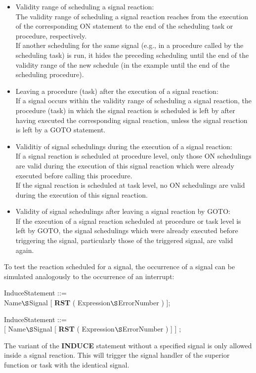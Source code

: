 \begin{itemize}
\item Validity range of scheduling a signal reaction:\\
The validity range of scheduling a signal reaction reaches from the
execution of the corresponding ON statement to the end of the
scheduling task or procedure, respectively.\\
If another scheduling for the same signal (e.g., in a procedure called
by the scheduling task) is run, it hides the preceding scheduling until
the end of the validity range of the new schedule (in the example until
the end of the scheduling procedure).
\item Leaving a procedure (task) after the execution of a signal
reaction:\\
If a signal occurs within the validity range of scheduling a signal
reaction, the procedure (task) in which the signal reaction is scheduled
is left by   after having executed the 
corresponding signal reaction, unless the signal reaction is left by a 
GOTO statement.
\item Validitiy of signal schedulings during the execution of a signal
reaction:\\
If a signal reaction is scheduled at procedure level, only those ON
schedulings are valid during the execution of this signal reaction which
were already executed before calling this procedure.\\
If the signal reaction is scheduled at task level, no ON schedulings are
valid during the execution of this signal reaction.
\item Validity of signal schedulings after leaving a signal reaction by
GOTO:\\
If the execution of a signal reaction scheduled at procedure or task
level is left by GOTO, the signal schedulings which were already
executed before triggering the signal, particularly those of the
triggered signal, are valid again.
\end{itemize}

To test the reaction scheduled for a signal, the occurrence of a signal
can be simulated analogously to the occurrence of an interrupt:

\begin{removed}
InduceStatement ::=\\
 Name$\S $Signal [ {\bf RST} ( Expression$\S $ErrorNumber ) ];
\end{removed}
\begin{added}
InduceStatement ::=\\
 [ Name$\S $Signal [ {\bf RST} ( Expression$\S $ErrorNumber ) ] ] ;

The variant of the {\bf INDUCE} statement without a specified signal is 
only allowed inside a signal reaction. This will trigger the signal handler
of the superior function or task with the identical signal.
\end{added}
\begin{grammar}

\end{grammar}


